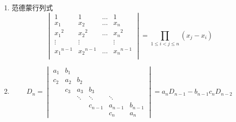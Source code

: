 \documentclass[./linear_algebra.tex]{subfiles}
\begin{document}
\begin{enumerate}
        \item 范德蒙行列式
        \[
            \begin{vmatrix}
                1           & 1           & \dots & 1           \\
                x_1         & x_2         & \dots & x_n \\
                {x_1}^{2}   & {x_2}^2     & \dots & {x_n}^2     \\
                \vdots      & \vdots      &       & \vdots \\
                {x_1}^{n-1} & {x_2}^{n-1} & \dots & {x_n}^{n-1} \\
            \end{vmatrix}
            = \prod_{1 \le i < j \le n} (x_{j} - x_{i})
        \]
        \item
        \[
            D_n =\begin{vmatrix}
                     a_1 & b_1 &        &        & &        \\
                     c_2 & a_2 & b_2    &        & &        \\
                     & c_3 & a_3    & b_3 & &       \\
                     &     & \ddots & \ddots & \ddots &\\
                     &     &        & c_{n-1}& a_{n-1} & b_{n-1} \\
                     &     &        && c_{n}& a_n
            \end{vmatrix} = a_{n}D_{n-1} - b_{n-1}c_{n}D_{n-2}
        \]
    \end{enumerate}
\end{document}
